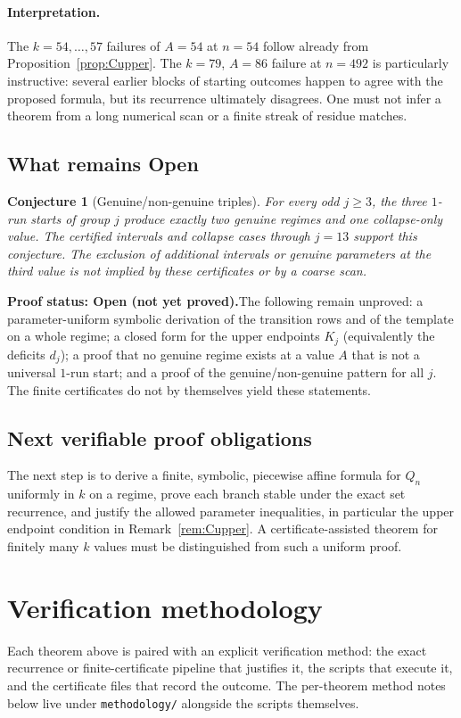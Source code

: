 \documentclass[11pt]{article}
\newtheorem{conjecture}[theorem]{Conjecture}
\theoremstyle{remark}
\newcommand{\statusopen}{\textbf{Proof status: Open (not yet proved).}}
\begin{document}
\paragraph{Interpretation.} The $k=54,\ldots,57$ failures of $A=54$ at $n=54$ follow already from Proposition~\ref{prop:Cupper}. The $k=79$, $A=86$ failure at $n=492$ is particularly instructive: several earlier blocks of starting outcomes happen to agree with the proposed formula, but its recurrence ultimately disagrees. One must not infer a theorem from a long numerical scan or a finite streak of residue matches.

\subsection{What remains Open}
\begin{conjecture}[Genuine/non-genuine triples]\label{conj:Chierarchy}
For every odd $j\ge3$, the three $1$-run starts of group $j$ produce exactly two genuine regimes and one collapse-only value. The certified intervals and collapse cases through $j=13$ support this conjecture. The exclusion of additional intervals or genuine parameters at the third value is not implied by these certificates or by a coarse scan.
\end{conjecture}
\statusopen\quad The following remain unproved: a parameter-uniform symbolic derivation of the transition rows and of the template on a whole regime; a closed form for the upper endpoints $K_j$ (equivalently the deficits $d_j$); a proof that no genuine regime exists at a value $A$ that is not a universal $1$-run start; and a proof of the genuine/non-genuine pattern for all $j$. The finite certificates do not by themselves yield these statements.

\subsection{Next verifiable proof obligations}
The next step is to derive a finite, symbolic, piecewise affine formula for $Q_n$ uniformly in $k$ on a regime, prove each branch stable under the exact set recurrence, and justify the allowed parameter inequalities, in particular the upper endpoint condition in Remark~\ref{rem:Cupper}. A certificate-assisted theorem for finitely many $k$ values must be distinguished from such a uniform proof.\par

\section{Verification methodology}\label{sec:methodology}
Each theorem above is paired with an explicit verification method: the exact recurrence or finite-certificate pipeline that justifies it, the scripts that execute it, and the certificate files that record the outcome. The per-theorem method notes below live under \texttt{methodology/} alongside the scripts themselves.
\end{document}
